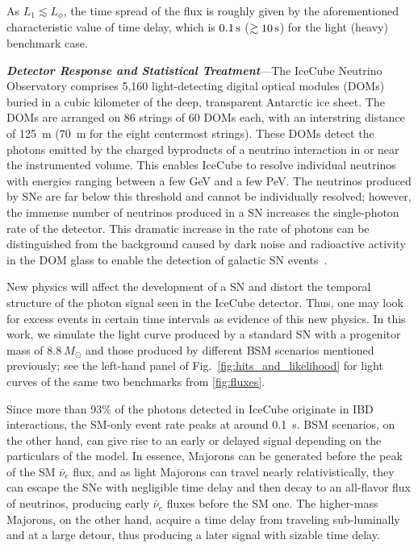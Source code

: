 \documentclass[aps,twocolumn,prl,showpacs,showkeys,preprintnumbers,superscriptaddress,nobibnotes,floatfix,longbibliography,notitlepage,nofootinbib]{revtex4-2}
\begin{document}
As $L_1\lesssim L_\phi$, the time spread of the flux is roughly given by the aforementioned characteristic value of time delay, which is $\unit[0.1]{s}$ ($\gtrsim\unit[10]{s}$) for the light (heavy) benchmark case.


\textbf{\textit{Detector Response and Statistical Treatment}}---The IceCube Neutrino Observatory comprises 5,160 light-detecting digital optical modules (DOMs) buried in a cubic kilometer of the deep, transparent Antarctic ice sheet.
The DOMs are arranged on 86 strings of 60 DOMs each, with an interstring distance of 125~m (70~m for the eight centermost strings).
These DOMs detect the photons emitted by the charged byproducts of a neutrino interaction in or near the instrumented volume.
This enables IceCube to resolve individual neutrinos with energies ranging between a few GeV and a few PeV.
The neutrinos produced by SNe are far below this threshold and cannot be individually resolved; however, the immense number of neutrinos produced in a SN increases the single-photon rate of the detector.
This dramatic increase in the rate of photons can be distinguished from the background caused by dark noise and radioactive activity in the DOM glass to enable the detection of galactic SN events~\cite{Griswold:2023iwz}.

New physics will affect the development of a SN and distort the temporal structure of the photon signal seen in the IceCube detector.
Thus, one may look for excess events in certain time intervals as evidence of this new physics.
In this work, we simulate the light curve produced by a standard SN with a progenitor mass of $8.8~M_{\odot}$ and those produced by different BSM scenarios mentioned previously; see the left-hand panel of Fig.~\ref{fig:hits_and_likelihood} for light curves of the same two benchmarks from \cref{fig:fluxes}.

Since more than 93\% of the photons detected in IceCube originate in IBD interactions, the SM-only event rate peaks at around 0.1~s.
BSM scenarios, on the other hand, can give rise to an early or delayed signal depending on the particulars of the model.
In essence, Majorons can be generated before the peak of the SM $\bar{\nu}_{e}$ flux, and as light Majorons can travel nearly relativistically, they can escape the SNe with negligible time delay and then decay to an all-flavor flux of neutrinos, producing early $\bar{\nu}_{e}$ fluxes before the SM one.
The higher-mass Majorons, on the other hand, acquire a time delay from traveling sub-luminally and at a large detour, thus producing a later signal with sizable time delay.
\end{document}

